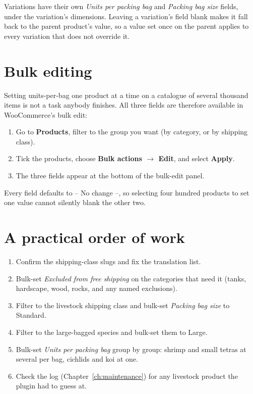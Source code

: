 \documentclass[11pt,a4paper,oneside]{report}
\newcommand{\menu}[1]{\textsf{\textbf{#1}}}
\begin{document}
\begin{houseinfo}[Variations]
Variations have their own \emph{Units per packing bag} and \emph{Packing bag size}
fields, under the variation's dimensions. Leaving a variation's field blank makes it
fall back to the parent product's value, so a value set once on the parent applies to
every variation that does not override it.
\end{houseinfo}

\section{Bulk editing}

Setting units-per-bag one product at a time on a catalogue of several thousand items
is not a task anybody finishes. All three fields are therefore available in
WooCommerce's bulk edit:

\begin{enumerate}
  \item Go to \menu{Products}, filter to the group you want (by category, or by
        shipping class).
  \item Tick the products, choose \menu{Bulk actions $\rightarrow$ Edit}, and select
        \menu{Apply}.
  \item The three fields appear at the bottom of the bulk-edit panel.
\end{enumerate}

Every field defaults to \textsf{-- No change --}, so selecting four hundred products
to set one value cannot silently blank the other two.

\section{A practical order of work}

\begin{enumerate}
  \item Confirm the shipping-class slugs and fix the translation list.
  \item Bulk-set \emph{Excluded from free shipping} on the categories that need it
        (tanks, hardscape, wood, rocks, and any named exclusions).
  \item Filter to the livestock shipping class and bulk-set \emph{Packing bag size} to
        \textsf{Standard}.
  \item Filter to the large-bagged species and bulk-set them to \textsf{Large}.
  \item Bulk-set \emph{Units per packing bag} group by group: shrimp and small
        tetras at several per bag, cichlids and koi at one.
  \item Check the log (Chapter~\ref{ch:maintenance}) for any livestock product the
        plugin had to guess at.
\end{enumerate}
\end{document}
